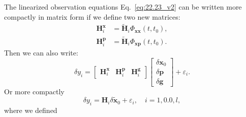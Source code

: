 \documentclass[lineno, pdflatex,sn-mathphys-ay]{sn-jnl}
\theoremstyle{thmstyleone}%
\theoremstyle{thmstyletwo}%
\theoremstyle{thmstylethree}%
\renewcommand{\vec}[1]{\boldsymbol{#1}}
\begin{document}
	The linearized observation equations Eq.~\eqref{eq:22.23_v2} can be written more compactly in matrix form if we define two new matrices:
	\begin{subequations}
		\begin{align}
			\vec{H}_{i}^{\vec{x}} &= \tilde{\vec{H}}_i \Phi_{\vec{xx}}(t, t_0), \\
			\vec{H}_{i}^{\vec{p}}  &= \tilde{\vec{H}}_i \Phi_{\vec{xp}}(t, t_0). 
		\end{align}
	\end{subequations}
	Then we can also write:
	\begin{equation}
		\delta{y}_i = 
		\begin{bmatrix}
			\vec{H}_{i}^{\vec{x}}  & 	\vec{H}_{i}^{\vec{p}} & \vec{H}^{\vec{g}}_i 
		\end{bmatrix}
		\begin{bmatrix}
			\delta\vec{x}_0 \\ \delta\vec{p} \\ \delta\vec{g} 
		\end{bmatrix}
		+ \varepsilon_i. %
	\end{equation}
	Or more compactly
	\begin{equation}
		\delta{y}_i = 	\vec{H}_{i} \delta\tilde{	\vec{x}}_0 	+ \varepsilon_i, \quad  i = 1, 0.0,l,
	\end{equation}
	where we defined
\end{document}
